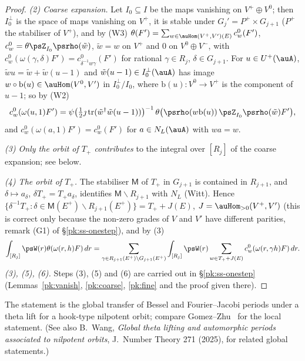 \documentclass[10pt]{amsart}
\theoremstyle{definition}
\theoremstyle{remark}
\begin{document}
\begin{proof}
\emph{(2) Coarse expansion.} Let $I_0\subseteq I$ be the maps vanishing on $V^+\oplus V^0$; then
$I_0^\perp$ is the space of maps vanishing on $V^+$, it is stable under $G_j'=P^+\times G_{j+1}$
($P^+$ the stabiliser of $V^+$), and by (W3)
$\theta(F')=\sum_{w\in\auHom(V^+,V')(E)}c^0_w(F')$, $c^0_w=\theta\psZ_{I_0}\psrho(\tilde w)$,
$\tilde w=w$ on $V^+$ and $0$ on $V^0\oplus V^-$, with $c^0_w(\omega(\gamma,\delta)F')=
c^0_{\delta^{-1}w\gamma}(F')$ for rational $\gamma\in R_j$, $\delta\in G_{j+1}$. For $u\in U^+
(\auA)$, $\tilde wu=\tilde w+\tilde w(u-1)$ and $\tilde w(u-1)\in I_0^\perp(\auA)$ has image
$w\circ\mathrm b(u)\in\auHom(V^0,V')$ in $I_0^\perp/I_0$, where $\mathrm b(u)\colon V^0\to V^+$ is
the component of $u-1$; so by (W2)
\begin{equation}\label{ps:eq-coarse}
c^0_w(\omega(u,1)F')=\psi\bigl(\tfrac12\jmath\operatorname{tr}(\tilde w^\dagger\tilde w(u-1))
\bigr)^{-1}\,\theta\bigl(\psrho(w\mathrm b(u))\,\psZ_{I_0}\psrho(\tilde w)F'\bigr),
\end{equation}
and $c^0_w(\omega(a,1)F')=c^0_w(F')$ for $a\in N_L(\auA)$ with $wa=w$.

\emph{(3) Only the orbit of $T_+$ contributes} to the integral over $[R_j]$ of the coarse
expansion; see below.

\emph{(4) The orbit of $T_+$.} The stabiliser $\mathsf M$ of $T_+$ in $G_{j+1}$ is contained in
$R_{j+1}$, and $\delta\mapsto a_\delta$, $\delta T_+=T_+a_\delta$, identifies
$\mathsf M\backslash R_{j+1}$ with $N_L$ (Witt). Hence $\{\delta^{-1}T_+:\delta\in\mathsf M(E^+)
\backslash R_{j+1}(E^+)\}=T_++J(E)$, $J=\auHom_{>0}(V^+,V')$ (this is correct only because the non-zero grades of $V$ and
$V'$ have different parities, remark (G1) of \S\ref{pk:ss-onestep}), and by (3)
\[
\int_{[R_j]}\psW(r)\theta(\omega(r,h)F)\,dr=\sum_{\gamma\in R_{j+1}(E^+)\backslash G_{j+1}(E^+)}
\int_{[R_j]}\psW(r)\sum_{w\in T_++J(E)}c^0_w(\omega(r,\gamma h)F)\,dr .
\]
\emph{(3), (5), (6).} Steps (3), (5) and (6) are carried out in \S\ref{pk:ss-onestep}
(Lemmas~\ref{pk:vanish}, \ref{pk:coarse}, \ref{pk:fine} and the proof given there).
\end{proof}

The statement is the global transfer of Bessel and Fourier--Jacobi periods under a theta lift for
a hook-type nilpotent orbit; compare Gomez--Zhu~\cite{GomezZhu} for the local statement. (See also B.~Wang, \emph{Global theta lifting and automorphic periods associated to
nilpotent orbits}, J.\ Number Theory 271 (2025), for related global statements.)
\end{document}

